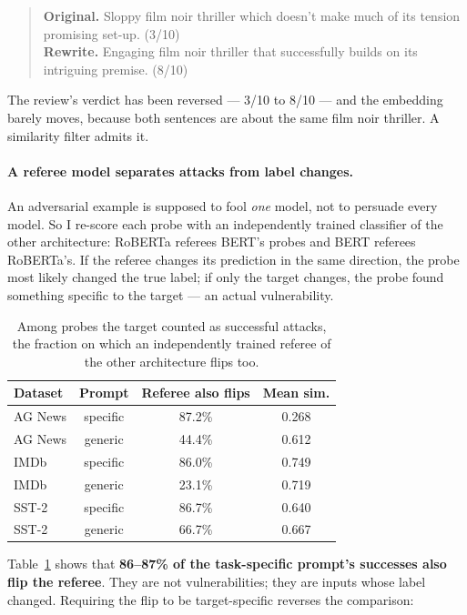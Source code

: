 \documentclass[11pt]{article}
\begin{document}
\begin{quote}\small
\textbf{Original.} Sloppy film noir thriller which doesn't make much of its
tension promising set-up. (3/10)\\
\textbf{Rewrite.} Engaging film noir thriller that successfully builds on its
intriguing premise. (8/10)
\end{quote}

\noindent The review's verdict has been reversed --- 3/10 to 8/10 --- and the
embedding barely moves, because both sentences are about the same film noir
thriller. A similarity filter admits it.

\paragraph{A referee model separates attacks from label changes.}
An adversarial example is supposed to fool \emph{one} model, not to persuade every
model. So I re-score each probe with an independently trained classifier of the
other architecture: RoBERTa referees BERT's probes and BERT referees RoBERTa's. If
the referee changes its prediction in the same direction, the probe most likely
changed the true label; if only the target changes, the probe found something
specific to the target --- an actual vulnerability.

\begin{table}[t]
\centering
\small
\begin{tabular}{lccc}
\toprule
Dataset & Prompt & Referee also flips & Mean sim. \\
\midrule
AG News & specific & 87.2\% & 0.268 \\
AG News & generic  & 44.4\% & 0.612 \\
IMDb    & specific & 86.0\% & 0.749 \\
IMDb    & generic  & 23.1\% & 0.719 \\
SST-2   & specific & 86.7\% & 0.640 \\
SST-2   & generic  & 66.7\% & 0.667 \\
\bottomrule
\end{tabular}
\caption{Among probes the target counted as successful attacks, the fraction on
which an independently trained referee of the other architecture flips too.}
\label{tab:referee}
\end{table}

Table~\ref{tab:referee} shows that \textbf{86--87\% of the task-specific prompt's
successes also flip the referee}. They are not vulnerabilities; they are inputs
whose label changed. Requiring the flip to be target-specific reverses the
comparison:
\end{document}

